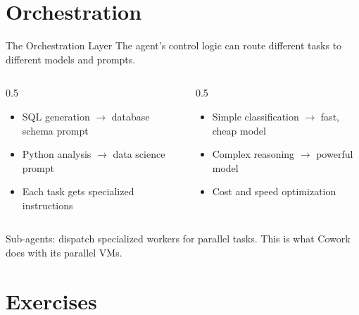 \documentclass[aspectratio=169]{beamer}
\begin{document}
\section{Orchestration}

\begin{frame}{The Orchestration Layer}
The agent's control logic can route different tasks to different models and prompts.
\vspace{0.3cm}
\begin{columns}[T]
\begin{column}{0.5\textwidth}
\begin{shadedbox}[title=\textbf{Different Prompts}]
\begin{itemize}\small
  \item SQL generation $\rightarrow$ database schema prompt
  \item Python analysis $\rightarrow$ data science prompt
  \item Each task gets specialized instructions
\end{itemize}
\end{shadedbox}
\end{column}
\begin{column}{0.5\textwidth}
\begin{shadedbox}[title=\textbf{Different Models}]
\begin{itemize}\small
  \item Simple classification $\rightarrow$ fast, cheap model
  \item Complex reasoning $\rightarrow$ powerful model
  \item Cost and speed optimization
\end{itemize}
\end{shadedbox}
\end{column}
\end{columns}
\vspace{0.3cm}
Sub-agents: dispatch specialized workers for parallel tasks. This is what Cowork does with its parallel VMs.
\end{frame}

\section{Exercises}
\end{document}
